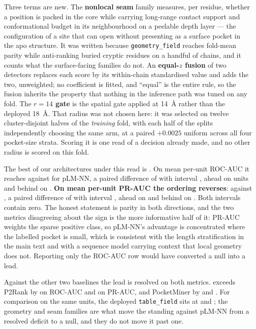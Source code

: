 Three terms are new. The \textbf{nonlocal seam} family measures, per residue,
whether a position is packed in the core while carrying long-range contact
support and conformational budget in its neighbourhood on a peelable depth
layer --- the configuration of a site that can open without presenting as a
surface pocket in the apo structure. It was written because
\texttt{geometry\_field} reaches fold-mean parity while anti-ranking buried
cryptic residues on a handful of chains, and it counts what the surface-facing
families do not. An \textbf{equal-$z$ fusion} of two detectors replaces each
score by its within-chain standardised value and adds the two, unweighted; no
coefficient is fitted, and ``equal'' is the entire rule, so the fusion inherits
the property that nothing in the inference path was tuned on any fold. The
\textbf{$r{=}14$ gate} is the spatial gate applied at 14~\AA{} rather than the
deployed 18~\AA{}. That radius was not chosen here: it was selected on twelve
cluster-disjoint halves of the \emph{training} fold, with each half of the
splits independently choosing the same arm, at a paired $+0.0025$ uniform across
all four pocket-size strata. Scoring it is one read of a decision already made,
and no other radius is scored on this fold.

The best of our architectures under this read is \GrandBest{}. On mean per-unit
ROC-AUC it reaches \GrandBestRoc{} against \GrandPlmRoc{} for pLM-NN, a paired
difference of \GrandDPlmRoc{} with interval \GrandDPlmRocCI{}, ahead on
\GrandDPlmRocWin{} units and behind on \GrandDPlmRocLoss{}. \textbf{On mean
per-unit PR-AUC the ordering reverses}: \GrandBestPr{} against \GrandPlmPr{}, a
paired difference of \GrandDPlmPr{} with interval \GrandDPlmPrCI{}, ahead on
\GrandDPlmPrWin{} and behind on \GrandDPlmPrLoss{}. Both intervals contain zero.
The honest statement is parity in both directions, and the two metrics
disagreeing about the sign is the more informative half of it: PR-AUC weights
the sparse positive class, so pLM-NN's advantage is concentrated where the
labelled pocket is small, which is consistent with the length stratification in
the main text and with a sequence model carrying context that local geometry
does not. Reporting only the ROC-AUC row would have converted a null into a
lead.

Against the other two baselines the lead is resolved on both metrics.
\GrandBest{} exceeds P2Rank by \GrandDPTwoRoc{} \GrandDPTwoRocCI{} on ROC-AUC
and \GrandDPTwoPr{} \GrandDPTwoPrCI{} on PR-AUC, and PocketMiner by
\GrandDPmRoc{} \GrandDPmRocCI{} and \GrandDPmPr{} \GrandDPmPrCI{}. For
comparison on the same units, the deployed \texttt{table\_field} sits at
\GrandTabRoc{} and \GrandTabPr{}; the geometry and seam families are what move
the standing against pLM-NN from a resolved deficit to a null, and they do not
move it past one.


